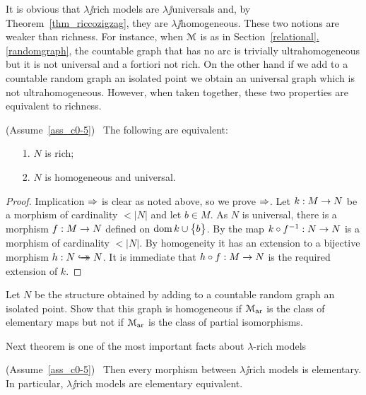 \documentclass[creche.tex]{subfiles}
\begin{document}
It is obvious that $\lambda\jj$rich models are $\lambda\jj$universals and, by Theorem~\ref{thm_riccozigzag}, they are $\lambda\jj$ho\-mo\-ge\-ne\-ous. These two notions are weaker than richness. For instance, when $\EuScript M$ is as in Section~\hyperref[randomgraph]{\ref*{relational}.\ref*{randomgraph}}, the countable graph that has no arc is trivially ultrahomogeneous but it is not universal and a fortiori not rich. On the other hand if we add to a countable random graph an isolated point we obtain an universal graph which is not ultrahomogeneous. However, when taken together, these two properties are equivalent to richness.

\begin{theorem}\label{ricco<->universaleomogeneo}
(Assume~\ref{ass_c0-5}) \ The following are equivalent:
\begin{itemize}
\item[1.] $N$ is rich;
\item[2.] $N$ is homogeneous and universal.
\end{itemize}
\end{theorem}
\begin{proof} 
Implication $\Rightarrow$ is clear as noted above, so we prove $\Rightarrow$. Let $k:M\rightarrow N$ be a morphism of cardinality $<|N|$ and let $b\in M$. As $N$ is universal, there is a morphism \hbox{$f:M\rightarrow N$} defined on $\mathop{\rm dom} k\cup\big\{b\big\}$. By  the map $k\circ f^{-1}:N\rightarrow N$ is a morphism of cardinality $<|N|$. By homogeneity it has an extension to a bijective morphism $h:N\hookrightarrow\mathrel{\mspace{-15mu}}\rightarrow N$. It is immediate that $h\circ f:M\rightarrow N$ is the required extension of $k$.
\end{proof}


\begin{exercise}
Let $N$ be the structure obtained by adding to a countable random graph an isolated point. Show that this graph is homogeneous if $\EuScript M_{\rm ar}$ is the class of elementary maps but not if $\EuScript M_{\rm ar}$ is the class of partial isomorphisms.\QED
\end{exercise}

Next theorem is one of the most important facts about $\lambda$-rich models

\begin{theorem}\label{thm_morphism_rich_elementary}
(Assume~\ref{ass_c0-5})  \  Then every morphism between $\lambda\jj$rich models is elementary. In particular, $\lambda\jj$rich models are elementary equivalent.
\end{theorem}
\end{document}
